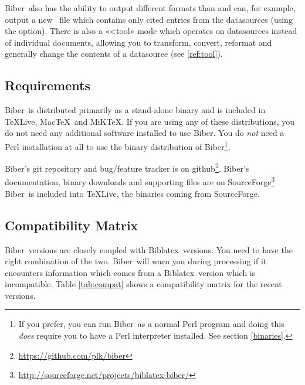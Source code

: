 \documentclass{ltxdockit}
\newcommand*{\biber}{Biber\xspace}
\newcommand*{\biblatex}{Biblatex\xspace}
\begin{document}
\biber\ also has the ability to output different formats than 
and can, for example, output a new \bibtex\ file which contains only
cited entries from the datasources (using the 
option). There is also a «<tool» mode which operates on datasources instead
of individual documents, allowing you to transform, convert, reformat and
generally change the contents of a datasource (see \ref{ref:tool}).

\subsection{Requirements}\label{ref:req}

\biber\ is distributed primarily as a stand-alone binary and is
included in \TeX Live, Mac\TeX\ and MiK\TeX. If you are using any of these
distributions, you do not need any additional software installed to use
\biber. You do \emph{not} need a Perl installation at all to use
the binary distribution of \biber\footnote{If you prefer, you can run
\biber\ as a normal Perl program and doing this \emph{does} require
you to have a Perl interpreter installed. See section \ref{binaries}.}.

\biber's git repository and bug/feature tracker is on
github\footnote{\url{https://github.com/plk/biber}}. \biber's documentation,
binary downloads and supporting files are on
SourceForge\footnote{\url{http://sourceforge.net/projects/biblatex-biber/}}
\biber\ is included into \TeX Live, the binaries coming from SourceForge.

\subsection{Compatibility Matrix}

\biber\ versions are closely coupled with \biblatex\ versions. You
need to have the right combination of the two. \biber\ will warn you
during processing if it encounters information which comes from a
\biblatex\ version which is incompatible. Table \ref{tab:compat} shows a
compatibility matrix for the recent versions.
\end{document}
